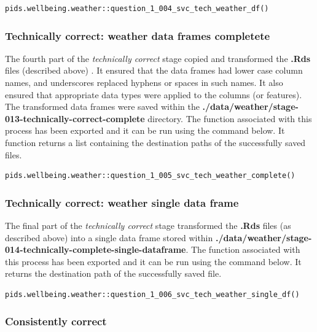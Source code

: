 \documentclass[12pt, oneside, openany]{book}
\begin{document}
\bigskip
\begin{lstlisting}
pids.wellbeing.weather::question_1_004_svc_tech_weather_df()
\end{lstlisting}

\newpage
\subsubsection*{Technically correct: weather data frames completete}

The fourth part of the \emph{technically correct} stage copied and transformed the \textbf{.Rds} files (described above) . It ensured that the data frames had lower case column names, and underscores replaced hyphens or spaces in such names. It also ensured that appropriate data types were applied to the columns (or features). The transformed data frames were saved within the \textbf{./data/weather/stage-013-technically-correct-complete} directory. The function associated with this process has been exported and it can be run using the command below. It function returns a list containing the destination paths of the successfully saved files.

\bigskip
\begin{lstlisting}
pids.wellbeing.weather::question_1_005_svc_tech_weather_complete()
\end{lstlisting}

\subsubsection*{Technically correct: weather single data frame}

The final part of the \emph{technically correct} stage transformed the \textbf{.Rds} files (as described above) into a single data frame stored within \textbf{./data/weather/stage-014-technically-complete-single-dataframe}. The function associated with this process has been exported and it can be run using the command below. It returns the destination path of the successfully saved file.

\bigskip
\begin{lstlisting}
pids.wellbeing.weather::question_1_006_svc_tech_weather_single_df()
\end{lstlisting}

\subsubsection*{Consistently correct}
\end{document}
